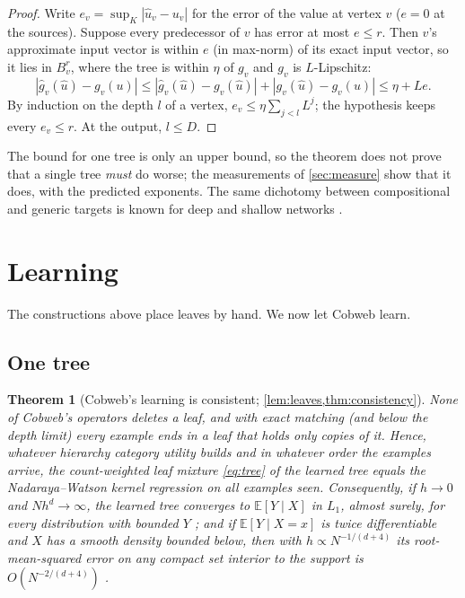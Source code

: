 \documentclass[11pt]{article}
\newtheorem{theorem}{Theorem}
\theoremstyle{definition}
\theoremstyle{remark}
\newcommand{\E}{\mathbb{E}}
\begin{document}
\begin{proof}
Write $e_v=\sup_K|\hat u_v-u_v|$ for the error of the value at vertex $v$ ($e=0$ at the
sources).  Suppose every predecessor of $v$ has error at most $e\le r$.  Then $v$'s
approximate input vector is within $e$ (in max-norm) of its exact input vector, so it lies
in $B_v^r$, where the tree is within $\eta$ of $g_v$ and $g_v$ is $L$-Lipschitz:
\[
  |\hat g_v(\hat u)-g_v(u)|\le|\hat g_v(\hat u)-g_v(\hat u)|+|g_v(\hat u)-g_v(u)|\le\eta+Le.
\]
By induction on the depth $l$ of a vertex, $e_v\le\eta\sum_{j<l}L^j$; the hypothesis keeps
every $e_v\le r$.  At the output, $l\le D$.
\end{proof}

The bound for one tree is only an upper bound, so the theorem does not prove that a single
tree \emph{must} do worse; the measurements of \cref{sec:measure} show that it does, with
the predicted exponents.  The same dichotomy between compositional and generic targets is
known for deep and shallow networks \citep{poggio2017}.

\section{Learning}\label{sec:learn-main}

The constructions above place leaves by hand.  We now let Cobweb learn.

\subsection{One tree}

\begin{theorem}[Cobweb's learning is consistent; \cref{lem:leaves,thm:consistency}]\label{thm:learn-tree}
None of Cobweb's operators deletes a leaf, and with exact matching (and below the depth
limit) every example ends in a leaf that holds only copies of it.  Hence, whatever
hierarchy category utility builds and in whatever order the examples arrive, the
count-weighted leaf mixture \eqref{eq:tree} of the learned tree \emph{equals} the
Nadaraya--Watson kernel regression on all examples seen.  Consequently, if $h\to0$ and
$Nh^d\to\infty$, the learned tree converges to $\E[Y\mid X]$ in $L_1$, almost surely, for
every distribution with bounded $Y$ \citep{devroye1989}; and if $\E[Y\mid X=x]$ is twice
differentiable and $X$ has a smooth density bounded below, then with $h\propto
N^{-1/(d+4)}$ its root-mean-squared error on any compact set interior to the support is
$O(N^{-2/(d+4)})$ \citep{wand1995}.
\end{theorem}
\end{document}
